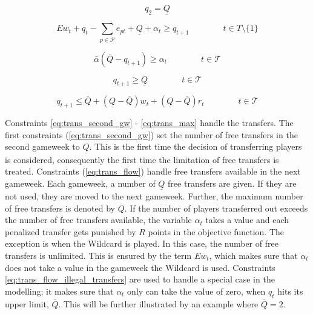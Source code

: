 \begin{equation} \label{eq:trans_second_gw}
    q_{2} = \underline{Q}
\end{equation}

\begin{equation} \label{eq:trans_flow}
   E w_{t} + q_{t}-\sum_{p \in \mathcal{P}}e_{pt} + \underline{Q} + \alpha_{t} \geq q_{t+1} \qquad\qquad t \in T\setminus\{1\}
\end{equation}


\begin{equation} \label{eq:trans_flow_illegal_transfers}
    \bar{\alpha}(\overline{Q}-q_{t+1}) \geq \alpha_{t} \qquad\qquad t \in \mathcal{T}
\end{equation}

\begin{equation} \label{eq:trans_min}
    q_{t+1} \geq \underline{Q} \qquad\qquad t \in \mathcal{T}
\end{equation}

\begin{equation} \label{eq:trans_max}
    q_{t+1} \leq \overline{Q} + (\underline{Q}-\overline{Q})w_{t} + (\underline{Q}-\overline{Q})r_{t} \qquad\qquad t \in \mathcal{T}
\end{equation}

\newpar

Constraints \eqref{eq:trans_second_gw} - \eqref{eq:trans_max} handle the transfers. The first constraints (\ref{eq:trans_second_gw}) set the number of free transfers in the second gameweek to $\underline{Q}$. This is the first time the decision of transferring players is considered, consequently the first time the limitation of free transfers is treated. Constraints (\ref{eq:trans_flow}) handle free transfers available in the next gameweek. Each gameweek, a number of $\underline{Q}$ free transfers are given. If they are not used, they are moved to the next gameweek. Further, the maximum number of free transfers is denoted by $\overline{Q}$. If the number of players transferred out exceeds the number of free transfers available, the variable $\alpha_{t}$ takes a value and each penalized transfer gets punished by $R$ points in the objective function. The exception is when the Wildcard is played. In this case, the number of free transfers is unlimited. This is ensured by the term $E w_{t}$, which makes sure that $\alpha_{t}$ does not take a value in the gameweek the Wildcard is used. Constraints \eqref{eq:trans_flow_illegal_transfers} are used to handle a special case in the modelling; it makes sure that $\alpha_{t}$ only can take the value of zero, when $q_{t}$ hits its upper limit, $\overline{Q}$. This will be further illustrated by an example where $\overline{Q} = 2$. 


